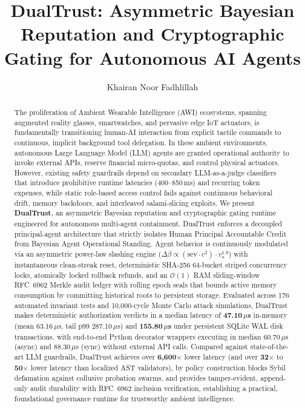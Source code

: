 \documentclass[manuscript, screen, review]{jair}
\begin{document}
\title[DualTrust: Asymmetric Bayesian Reputation and Cryptographic Gating]{DualTrust: Asymmetric Bayesian Reputation and Cryptographic Gating for Autonomous AI Agents}

\author{Khairan Noor Fadhlillah}

\renewcommand{\shortauthors}{Fadhlillah}

\begin{abstract}
The proliferation of Ambient Wearable Intelligence (AWI) ecosystems, spanning augmented reality glasses, smartwatches, and pervasive edge IoT actuators, is fundamentally transitioning human-AI interaction from explicit tactile commands to continuous, implicit background tool delegation. In these ambient environments, autonomous Large Language Model (LLM) agents are granted operational authority to invoke external APIs, reserve financial micro-quotas, and control physical actuators. However, existing safety guardrails depend on secondary LLM-as-a-judge classifiers that introduce prohibitive runtime latencies (400--850\,ms) and recurring token expenses, while static role-based access control fails against continuous behavioral drift, memory backdoors, and interleaved salami-slicing exploits. We present \textbf{DualTrust}, an asymmetric Bayesian reputation and cryptographic gating runtime engineered for autonomous multi-agent containment. DualTrust enforces a decoupled principal-agent architecture that strictly isolates Human Principal Accountable Credit from Bayesian Agent Operational Standing. Agent behavior is continuously modulated via an asymmetric power-law slashing engine ($\Delta\beta \propto (\text{sev} \cdot c^2) \cdot v_a^{1.8}$) with instantaneous clean-streak reset, deterministic SHA-256 64-bucket striped concurrency locks, atomically locked rollback refunds, and an $\mathcal{O}(1)$ RAM sliding-window RFC~6962 Merkle audit ledger with rolling epoch seals that bounds active memory consumption by committing historical roots to persistent storage. Evaluated across 176 automated invariant tests and 10,000-cycle Monte Carlo attack simulations, DualTrust makes deterministic authorization verdicts in a median latency of \textbf{47.10\,$\mu$s} in-memory (mean 63.16\,$\mu$s, tail p99 287.10\,$\mu$s) and \textbf{155.80\,$\mu$s} under persistent SQLite WAL disk transactions, with end-to-end Python decorator wrappers executing in median 60.70\,$\mu$s (async) and 88.30\,$\mu$s (sync) without external API calls. Compared against state-of-the-art LLM guardrails, DualTrust achieves over \textbf{6,600$\times$} lower latency (and over \textbf{32$\times$} to \textbf{50$\times$} lower latency than localized AST validators), by policy construction blocks Sybil defamation against collusive probation swarms, and provides tamper-evident, append-only audit durability with RFC~6962 inclusion verification, establishing a practical, foundational governance runtime for trustworthy ambient intelligence.
\end{abstract}
\end{document}
